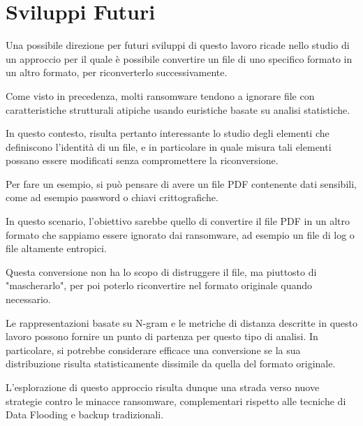 \documentclass{report}
\begin{document}
\section{Sviluppi Futuri}

Una possibile direzione per futuri sviluppi di questo lavoro ricade nello studio di un approccio per il quale 
è possibile convertire un file di uno specifico formato in un altro formato, per riconverterlo successivamente.

\bigskip

Come visto in precedenza, molti ransomware tendono a ignorare file con caratteristiche strutturali atipiche 
usando euristiche basate su analisi statistiche.

In questo contesto, risulta pertanto interessante lo studio degli elementi che definiscono l'identità di un file,
e in particolare in quale misura tali elementi possano essere modificati senza compromettere la riconversione.

\bigskip

Per fare un esempio, si può pensare di avere un file PDF contenente dati sensibili, 
come ad esempio password o chiavi crittografiche.

In questo scenario, l'obiettivo sarebbe quello di convertire il file PDF in un altro formato che sappiamo essere ignorato dai ransomware,
ad esempio un file di log o file altamente entropici.

Questa conversione non ha lo scopo di distruggere il file, ma piuttosto di "mascherarlo", per poi poterlo riconvertire nel formato originale
quando necessario.

\bigskip

Le rappresentazioni basate su N-gram e le metriche di distanza descritte in questo lavoro possono fornire un punto di partenza per questo tipo di analisi.
In particolare, si potrebbe considerare efficace una conversione se la sua distribuzione risulta
statisticamente dissimile da quella del formato originale.

\bigskip

L'esplorazione di questo approccio risulta dunque una strada verso nuove strategie contro le minacce ransomware,
complementari rispetto alle tecniche di Data Flooding e backup tradizionali.

\bigskip
\end{document}
